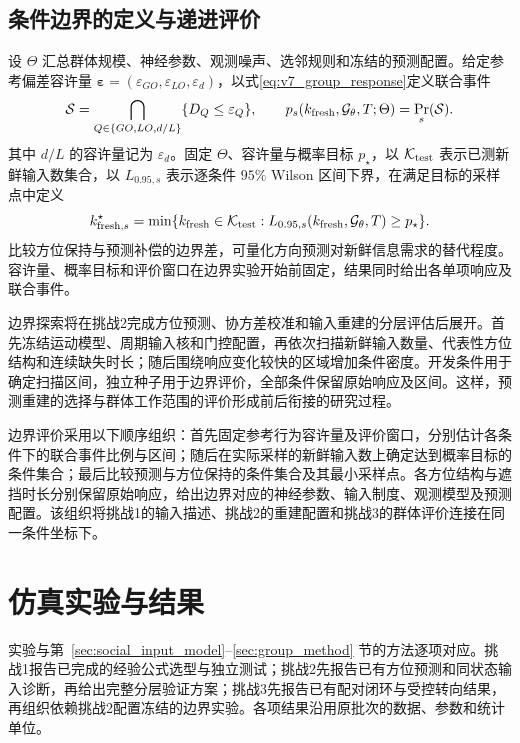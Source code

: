\documentclass[UTF8,fontset=windows,11pt]{ctexart}
\begin{document}
\subsection{条件边界的定义与递进评价}\label{sec:boundary_method}
设 $\Theta$ 汇总群体规模、神经参数、观测噪声、选邻规则和冻结的预测配置。给定参考偏差容许量 $\boldsymbol\varepsilon=(\varepsilon_{GO},\varepsilon_{LO},\varepsilon_d)$，以式\eqref{eq:v7_group_response}定义联合事件
\begin{equation}
 \mathcal S=\bigcap_{Q\in\{GO,LO,d/L\}}\{D_Q\le\varepsilon_Q\},
 \qquad
 p_s(k_{\rm fresh},\mathcal G_\theta,T;\Theta)
 =\Pr_s(\mathcal S).
 \label{eq:v7_boundary_event}
\end{equation}
其中 $d/L$ 的容许量记为 $\varepsilon_d$。固定 $\Theta$、容许量与概率目标 $p_\star$，以 $\mathcal K_{\rm test}$ 表示已测新鲜输入数集合，以 $L_{0.95,s}$ 表示逐条件 $95\%$ Wilson 区间下界，在满足目标的采样点中定义
\begin{equation}
 k_{{\rm fresh},s}^{\star}
 =\min\{k_{\rm fresh}\in\mathcal K_{\rm test}:
 L_{0.95,s}(k_{\rm fresh},\mathcal G_\theta,T)\ge p_\star\}.
 \label{eq:v7_fresh_boundary}
\end{equation}
比较方位保持与预测补偿的边界差，可量化方向预测对新鲜信息需求的替代程度。容许量、概率目标和评价窗口在边界实验开始前固定，结果同时给出各单项响应及联合事件。

边界探索将在挑战2完成方位预测、协方差校准和输入重建的分层评估后展开。首先冻结运动模型、周期输入核和门控配置，再依次扫描新鲜输入数量、代表性方位结构和连续缺失时长；随后围绕响应变化较快的区域增加条件密度。开发条件用于确定扫描区间，独立种子用于边界评价，全部条件保留原始响应及区间。这样，预测重建的选择与群体工作范围的评价形成前后衔接的研究过程。

边界评价采用以下顺序组织：首先固定参考行为容许量及评价窗口，分别估计各条件下的联合事件比例与区间；随后在实际采样的新鲜输入数上确定达到概率目标的条件集合；最后比较预测与方位保持的条件集合及其最小采样点。各方位结构与遮挡时长分别保留原始响应，给出边界对应的神经参数、输入制度、观测模型及预测配置。该组织将挑战1的输入描述、挑战2的重建配置和挑战3的群体评价连接在同一条件坐标下。



\section{仿真实验与结果}\label{sec:experiments}



实验与第~\ref{sec:social_input_model}--\ref{sec:group_method} 节的方法逐项对应。挑战1报告已完成的经验公式选型与独立测试；挑战2先报告已有方位预测和同状态输入诊断，再给出完整分层验证方案；挑战3先报告已有配对闭环与受控转向结果，再组织依赖挑战2配置冻结的边界实验。各项结果沿用原批次的数据、参数和统计单位。
\end{document}
